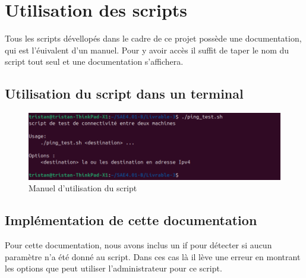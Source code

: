 \documentclass[../file_doc_script.tex]{subfiles}
\begin{document}
\section{Utilisation des scripts}
Tous les scripts dévellopés dans le cadre de ce projet possède une documentation,
qui est l'éuivalent d'un manuel. Pour y avoir accès il suffit de taper le nom du script
tout seul et une documentation s'affichera.

\subsection{Utilisation du script dans un terminal}
\begin{figure}[h]
    \includegraphics[width=1\textwidth]{../Images/doc-script-terminal.png}
    \caption{Manuel d'utilisation du script}
    \label{fig:solution1}
\end{figure}

\subsection{Implémentation de cette documentation}
Pour cette documentation, nous avons inclus un if pour détecter si aucun paramètre n'a été 
donné au script. Dans ces cas là il lève une erreur en montrant les options que peut utiliser 
l'administrateur pour ce script.

\UseRawInputEncoding

\end{document}
